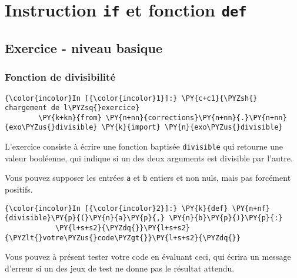     
    
    
    

    

    \hypertarget{instruction-if-et-fonction-def}{%
\section{\texorpdfstring{Instruction \texttt{if} et fonction
\texttt{def}}{Instruction if et fonction def}}\label{instruction-if-et-fonction-def}}

    \hypertarget{exercice---niveau-basique}{%
\subsection{Exercice - niveau basique}\label{exercice---niveau-basique}}

    \hypertarget{fonction-de-divisibilituxe9}{%
\subsubsection{Fonction de
divisibilité}\label{fonction-de-divisibilituxe9}}

    \begin{Verbatim}[commandchars=\\\{\},frame=single,framerule=0.3mm,rulecolor=\color{cellframecolor}]
{\color{incolor}In [{\color{incolor}1}]:} \PY{c+c1}{\PYZsh{} chargement de l\PYZsq{}exercice}
        \PY{k+kn}{from} \PY{n+nn}{corrections}\PY{n+nn}{.}\PY{n+nn}{exo\PYZus{}divisible} \PY{k}{import} \PY{n}{exo\PYZus{}divisible}
\end{Verbatim}


    L'exercice consiste à écrire une fonction baptisée \texttt{divisible}
qui retourne une valeur booléenne, qui indique si un des deux arguments
est divisible par l'autre.

Vous pouvez supposer les entrées \texttt{a} et \texttt{b} entiers et non
nuls, mais pas forcément positifs.

    \begin{Verbatim}[commandchars=\\\{\},frame=single,framerule=0.3mm,rulecolor=\color{cellframecolor}]
{\color{incolor}In [{\color{incolor}2}]:} \PY{k}{def} \PY{n+nf}{divisible}\PY{p}{(}\PY{n}{a}\PY{p}{,} \PY{n}{b}\PY{p}{)}\PY{p}{:}
            \PY{l+s+s2}{\PYZdq{}}\PY{l+s+s2}{\PYZlt{}votre\PYZus{}code\PYZgt{}}\PY{l+s+s2}{\PYZdq{}}
\end{Verbatim}


    Vous pouvez à présent tester votre code en évaluant ceci, qui écrira un
message d'erreur si un des jeux de test ne donne pas le résultat
attendu.

